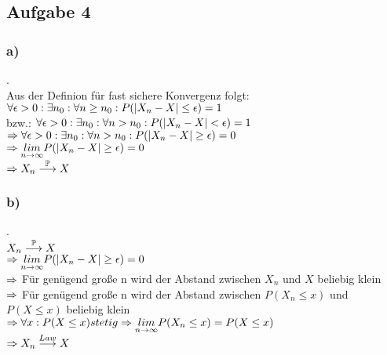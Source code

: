 \documentclass[11pt]{amsart}
\begin{document}
\subsection*{Aufgabe 4}
\subsubsection*{a)}.\\
Aus der Definion für fast sichere Konvergenz folgt: \\
\( \forall \epsilon > 0 : \exists n_0: \forall n \geq n_0: P(|X_n - X| \leq \epsilon) = 1 \) \\
bzw.: \( \forall \epsilon > 0 : \exists n_0: \forall n > n_0: P(|X_n - X| < \epsilon) = 1 \) \\
\( \Rightarrow \forall \epsilon > 0 : \exists n_0: \forall n > n_0: P(|X_n - X| \geq \epsilon) = 0 \) \\
\( \Rightarrow \underset{n\rightarrow \infty}{lim}P(|X_n - X| \geq \epsilon) = 0 \) \\
\( \Rightarrow X_n \overset{\mathbb{P}}{\longrightarrow} X \)
\subsubsection*{b)}.\\
\(X_n \overset{\mathbb{P}}{\longrightarrow} X \) \\
\( \Rightarrow \underset{n\rightarrow \infty}{lim}P(|X_n - X| \geq \epsilon) = 0 \) \\
$\Rightarrow$ Für genügend große n wird der Abstand zwischen $X_n$ und $X$ beliebig klein \\
$\Rightarrow$ Für genügend große n wird der Abstand zwischen $P(X_n \leq x)$ und $P(X \leq x)$ beliebig klein \\ 
\( \Rightarrow \forall x:P(X \leq x) stetig \Rightarrow \underset{n\rightarrow \infty}{lim}P(X_n \leq x) = P(X \leq x) \) \\
\( \Rightarrow X_n \overset{Law}{\longrightarrow} X \)
\end{document}
